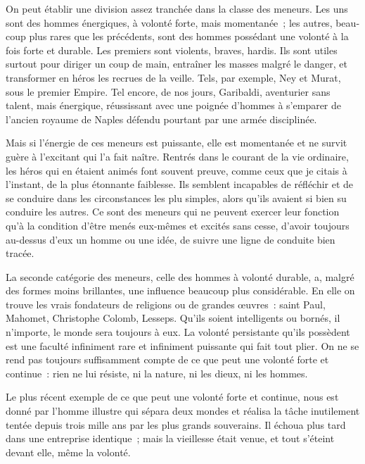 \documentclass[french,twoside]{book} %
\begin{document}
On peut établir une division assez tranchée dans la classe des meneurs. Les uns sont des hommes énergiques, à volonté forte, mais momentanée ; les autres, beau­coup plus rares que les précédents, sont des hommes possédant une volonté à la fois forte et durable. Les premiers sont violents, braves, hardis. Ils sont utiles surtout pour diriger un coup de main, entraîner les masses malgré le danger, et transformer en hé­ros les recrues de la veille. Tels, par exemple, Ney et Murat, sous le premier Empire. Tel encore, de nos jours, Garibaldi, aventurier sans talent, mais énergique, réussissant avec une poignée d’hommes à s’emparer de l’ancien royaume de Naples défendu pourtant par une armée disciplinée.\par
Mais si l’énergie de ces meneurs est puissante, elle est momentanée et ne survit guère à l’excitant qui l’a fait naître. Rentrés dans le courant de la vie ordinaire, les héros qui en étaient animés font souvent preuve, comme ceux que je citais à l’instant, de la plus étonnante faiblesse. Ils semblent incapables de réfléchir et de se conduire dans les circonstances les plu simples, alors qu’ils avaient si bien su conduire les autres. Ce sont des meneurs qui ne peuvent exercer leur fonction qu’à la condition d’être menés eux-mêmes et excités sans cesse, d’avoir toujours au-dessus d’eux un homme ou une idée, de suivre une ligne de conduite bien tracée.\par
La seconde catégorie des meneurs, celle des hommes à volonté durable, a, malgré des formes moins brillantes, une influence beaucoup plus considérable. En elle on trouve les vrais fondateurs de religions ou de grandes œuvres : saint Paul, Mahomet, Christophe Colomb, Lesseps. Qu’ils soient intelligents ou bornés, il n’importe, le monde sera toujours à eux. La volonté persistante qu’ils possèdent est une faculté infiniment rare et infiniment puissante qui fait tout plier. On ne se rend pas toujours suffisamment compte de ce que peut une volonté forte et continue : rien ne lui résiste, ni la nature, ni les dieux, ni les hommes.\par
Le plus récent exemple de ce que peut une volonté forte et continue, nous est don­né par l’homme illustre qui sépara deux mondes et réalisa la tâche inutilement tentée depuis trois mille ans par les plus grands souverains. Il échoua plus tard dans une entreprise identique ; mais la vieillesse était venue, et tout s’éteint devant elle, même la volonté.\par
\end{document}
